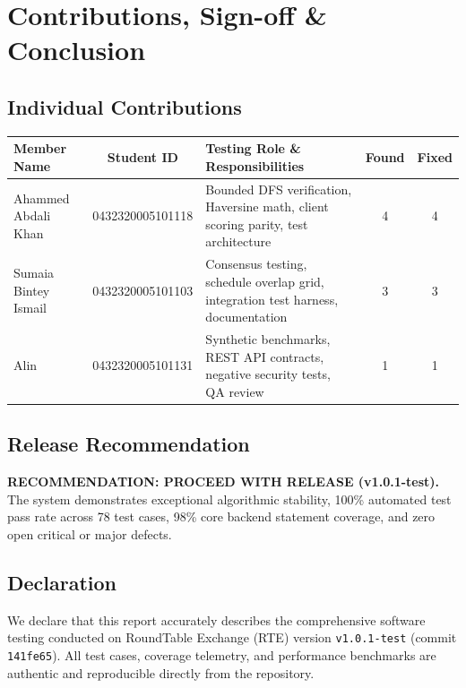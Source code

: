 \documentclass[12pt,a4paper]{report}
\begin{document}
\newpage

\chapter{Contributions, Sign-off \& Conclusion}

\section{Individual Contributions}
\begin{table}[ht]
\centering
\begin{tabularx}{\textwidth}{l c X c c}
\toprule
\textbf{Member Name} & \textbf{Student ID} & \textbf{Testing Role \& Responsibilities} & \textbf{Found} & \textbf{Fixed} \\
\midrule
Ahammed Abdali Khan & 0432320005101118 & Bounded DFS verification, Haversine math, client scoring parity, test architecture & 4 & 4 \\
Sumaia Bintey Ismail & 0432320005101103 & Consensus testing, schedule overlap grid, integration test harness, documentation & 3 & 3 \\
Alin & 0432320005101131 & Synthetic benchmarks, REST API contracts, negative security tests, QA review & 1 & 1 \\
\bottomrule
\end{tabularx}
\end{table}

\section{Release Recommendation}
\textbf{RECOMMENDATION: PROCEED WITH RELEASE (v1.0.1-test).}
The system demonstrates exceptional algorithmic stability, 100\% automated test pass rate across 78 test cases, 98\% core backend statement coverage, and zero open critical or major defects.

\section{Declaration}
We declare that this report accurately describes the comprehensive software testing conducted on RoundTable Exchange (RTE) version \texttt{v1.0.1-test} (commit \texttt{141fe65}). All test cases, coverage telemetry, and performance benchmarks are authentic and reproducible directly from the repository.
\end{document}
